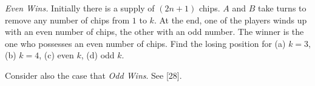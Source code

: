 \emph{Even Wins.} Initially there is a supply of $(2n + 1)$ chips. $A$ and $B$ take turns to remove any number of chips from $1$ to $k$. At the end, one of the players winds up with an even number of chips, the other with an odd number. The winner is the one who possesses an even number of chips. Find the losing position for (a) $k = 3$, (b) $k = 4$, (c) even $k$, (d) odd $k$.

Consider also the case that \emph{Odd Wins}. See [28].

